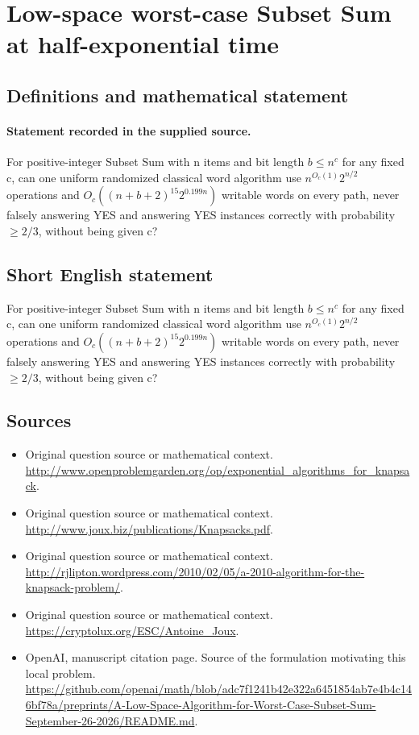 \documentclass[11pt]{article}
\begin{document}
\section*{Low-space worst-case Subset Sum at half-exponential time}\label{30007486}
\subsection{Definitions and mathematical statement}
\paragraph{Statement recorded in the supplied source.}
For positive-integer Subset Sum with n items and bit length $b\leq n^c$ for any fixed c, can one uniform randomized classical word algorithm use $n^{O_c(1)}2^{n/2}$ operations and $O_c((n+b+2)^{15}2^{0.199n})$ writable words on every path, never falsely answering YES and answering YES instances correctly with probability $\geq 2/3$, without being given c?
\subsection{Short English statement}
For positive-integer Subset Sum with n items and bit length $b\leq n^c$ for any fixed c, can one uniform randomized classical word algorithm use $n^{O_c(1)}2^{n/2}$ operations and $O_c((n+b+2)^{15}2^{0.199n})$ writable words on every path, never falsely answering YES and answering YES instances correctly with probability $\geq 2/3$, without being given c?
\subsection{Sources}
\begin{itemize}
\item[S1] Original question source or mathematical context.
\url{http://www.openproblemgarden.org/op/exponential_algorithms_for_knapsack}.
\item[S2] Original question source or mathematical context.
\url{http://www.joux.biz/publications/Knapsacks.pdf}.
\item[S3] Original question source or mathematical context.
\url{http://rjlipton.wordpress.com/2010/02/05/a-2010-algorithm-for-the-knapsack-problem/}.
\item[S4] Original question source or mathematical context.
\url{https://cryptolux.org/ESC/Antoine_Joux}.
\item[S5] OpenAI, manuscript citation page. Source of the formulation motivating this local problem.
\url{https://github.com/openai/math/blob/adc7f1241b42e322a6451854ab7e4b4c146bf78a/preprints/A-Low-Space-Algorithm-for-Worst-Case-Subset-Sum-September-26-2026/README.md}.
\end{itemize}
\end{document}

